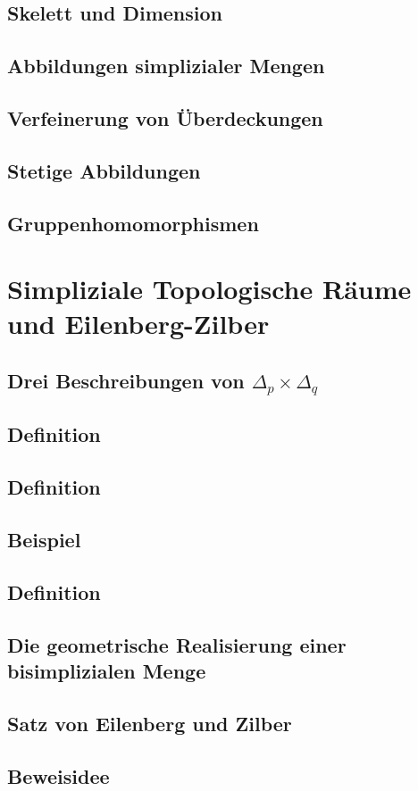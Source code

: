 \subsection{Skelett und Dimension}
\subsection{Abbildungen simplizialer Mengen}
\subsection{Verfeinerung von Überdeckungen}
\subsection{Stetige Abbildungen}
\subsection{Gruppenhomomorphismen}
\section{Simpliziale Topologische Räume und Eilenberg-Zilber}
\subsection{Drei Beschreibungen von $\Delta_p\times\Delta_q$}
\subsection{Definition}
\subsection{Definition}
\subsection{Beispiel}
\subsection{Definition}
\subsection{Die geometrische Realisierung einer bisimplizialen Menge}
\subsection{Satz von Eilenberg und Zilber}
\subsection{Beweisidee}

